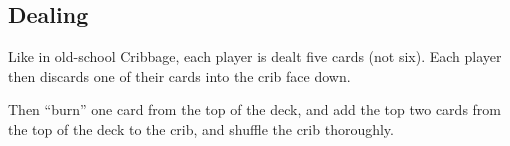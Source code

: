 \subsection{Dealing}
Like in old-school Cribbage, each player is dealt five cards (not six). 
Each player then discards one of their cards into the crib face down.

Then ``burn'' one card from the top of the deck, and add the top two cards from the top of the deck to the crib, and shuffle the crib thoroughly.